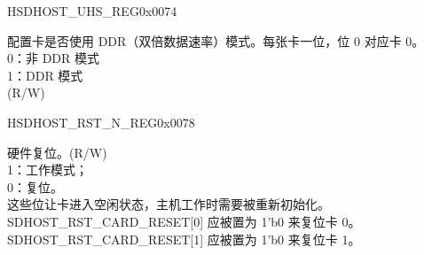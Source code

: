 \begin{register}{H}{SDHOST\_UHS\_REG}{0x{}0074}\label{regdesc:UHSREG}%
%
%
\regnewline%
\begin{regdesc}\begin{reglist}
\item [SDHOST\_DDR\_REG]配置卡是否使用 DDR（双倍数据速率）模式。每张卡一位，位 0 对应卡 0。\\
0：非 DDR 模式\\
1：DDR 模式\\ (R/W)
\end{reglist}\end{regdesc}
\end{register}


\begin{register}{H}{SDHOST\_RST\_N\_REG}{0x{}0078}\label{regdesc:RSTNREG}
%
%
\regnewline%
\begin{regdesc}\begin{reglist}
\item [SDHOST\_RST\_CARD\_RESET] 硬件复位。(R/W)\\
1：工作模式；\\
0：复位。\\
这些位让卡进入空闲状态，主机工作时需要被重新初始化。SDHOST\_RST\_CARD\_RESET[0] 应被置为 1'b0 来复位卡 0。SDHOST\_RST\_CARD\_RESET[1] 应被置为 1'b0 来复位卡 1。
\end{reglist}\end{regdesc}
\end{register}


